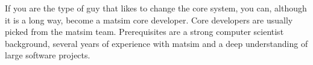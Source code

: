 If you are the type of guy that likes to change the core system, you can, although it is a long way, become a \gls{matsim} core developer. Core developers are usually picked from the \gls{matsim} team. Prerequisites are a strong computer scientist background, several years of experience with \gls{matsim} and a deep understanding of large software projects.

%
%
%
%
%
%
%
%

